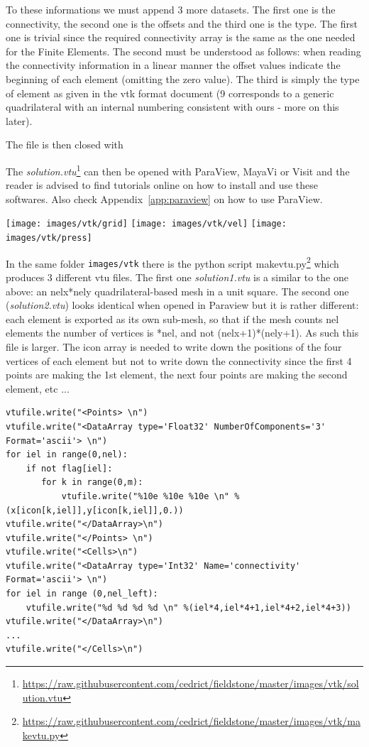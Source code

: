 To these informations we must append 3 more datasets. The first one is the connectivity, 
the second one is the offsets and the third one is the type. The first one is trivial
since the required connectivity array is the same as the one needed for the Finite Elements. 
The second must be understood as follows:
when reading the connectivity information in a linear manner the offset values 
indicate the beginning of each element (omitting the zero value). The third is simply the type of element 
as given in the vtk format document (9 corresponds to a generic quadrilateral with an 
internal numbering consistent with ours - more on this later). 



The file is then closed with



The {\sl solution.vtu}\footnote{\url{https://raw.githubusercontent.com/cedrict/fieldstone/master/images/vtk/solution.vtu}}  
can then be opened with ParaView, MayaVi or Visit and the reader 
is advised to find tutorials online on how to install and use these softwares. Also check Appendix~\ref{app:paraview} on how to use ParaView.

\begin{center}
\texttt{[image: images/vtk/grid]}
\texttt{[image: images/vtk/vel]}
\texttt{[image: images/vtk/press]}
\end{center}

In the same folder {\tt images/vtk} there is the python script 
{\pythonfile makevtu.py}\footnote{\url{https://raw.githubusercontent.com/cedrict/fieldstone/master/images/vtk/makevtu.py}} 
which produces 3 different vtu files. The first one {\sl solution1.vtu} is a 
similar to the one above: an {\python nelx*nely} quadrilateral-based mesh in a unit square. 
The second one ({\sl solution2.vtu}) looks identical when opened in Paraview but 
it is rather different: each element is exported as its own sub-mesh, so that if 
the mesh counts {\python nel} elements the number of vertices is 
{*nel}, and not {\python (nelx+1)*(nely+1)}. 
As such this file is larger. The icon array is needed to write down the positions of 
the four vertices of each element but not to write down the connectivity 
since the first 4 points are making the 1st element, 
the next four points are making the second element, etc ...

\begin{lstlisting}
vtufile.write("<Points> \n")
vtufile.write("<DataArray type='Float32' NumberOfComponents='3' Format='ascii'> \n")
for iel in range(0,nel):
    if not flag[iel]:
       for k in range(0,m):
           vtufile.write("%10e %10e %10e \n" %(x[icon[k,iel]],y[icon[k,iel]],0.))
vtufile.write("</DataArray>\n")
vtufile.write("</Points> \n")
vtufile.write("<Cells>\n")
vtufile.write("<DataArray type='Int32' Name='connectivity' Format='ascii'> \n")
for iel in range (0,nel_left):
    vtufile.write("%d %d %d %d \n" %(iel*4,iel*4+1,iel*4+2,iel*4+3))
vtufile.write("</DataArray>\n")
...
vtufile.write("</Cells>\n")
\end{lstlisting}

